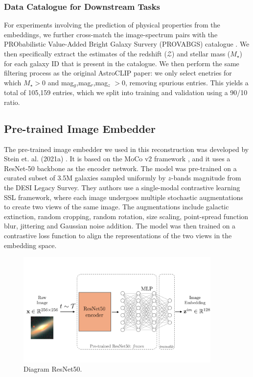 \documentclass[a4paper,12pt]{article}
\begin{document}
\subsubsection*{Data Catalogue for Downstream Tasks}
For experiments involving the prediction of physical properties from the embeddings, we further cross-match the image-spectrum pairs with the PRObabilistic Value-Added Bright Galaxy Survery (PROVABGS) catalogue \cite{PROVABGS}. We then specifically extract the estimates of the redshift ($\mathcal{Z}$) and stellar mass ($M_{\star}$) for each galaxy ID that is present in the catalogue. We then perform the same filtering process as the original AstroCLIP paper: we only select enetries for which $M_{\star} > 0$ and mag$_g$,mag$_r$,mag$_z$ $> 0$, removing spurious entries. This yields a total of 105,159 entries, which we split into training and validation using a 90/10 ratio.



\subsection{Pre-trained Image Embedder} 
The pre-trained image embedder we used in this reconstruction was developed by Stein et. al. (2021a) \cite{stein}. It is based on the MoCo v2 framework \cite{mocov2}, and it uses a ResNet-50 backbone as the encoder network. The model was pre-trained on a curated subset of 3.5M galaxies sampled uniformly by $z$-bands magnitude from the DESI Legacy Survey. They authors use a single-modal contrastive learning SSL framework, where each image undergoes multiple stochastic augmentations to create two views of the same image. The augmentations include galactic extinction, random cropping, random rotation, size scaling, point-spread function blur, jittering and Gaussian noise addition. The model was then trained on a contrastive loss function to align the representations of the two views in the embedding space. 

\begin{figure}[H]
    \centering
    \includegraphics[width=0.9\textwidth]{../figures/diagram_resnet.pdf}
    \caption{Diagram ResNet50.}
\end{figure}
\end{document}
